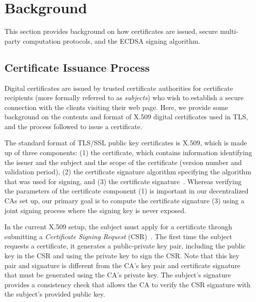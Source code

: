 \section{Background}
\label{sec:background}
This section provides background on how certificates are issued, secure multi-party computation protocols, and the ECDSA signing algorithm.

\subsection{Certificate Issuance Process}
\label{sec:certificate_issuance_process}

Digital certificates are issued by trusted certificate authorities for certificate recipients (more formally referred to as \emph{subjects}) who wish to establish a secure connection with the clients visiting their web page. Here, we provide some background on the contents and format of X.509 digital certificates used in TLS, and the process followed to issue a certificate.

 The standard format of TLS/SSL public key certificates is X.509, which is made up of three components: (1) the certificate, which contains information identifying the issuer and the subject and the scope of the certificate (version number and validation period), (2) the certificate signature algorithm specifying the algorithm that was used for signing, and (3) the certificate signature~\cite{x509_certificate_standard}. Whereas verifying the parameters of the certificate component (1) is important in our decentralized CAs set up, our primary goal is to compute the certificate signature (3) using a joint signing process where the signing key is never exposed.


In the current X.509 setup, the subject must apply for a certificate through submitting a \emph{Certificate Signing Request} (CSR)~\cite{certificate_signing_request}. The first time the subject requests a certificate, it generates a public-private key pair, including the public key in the CSR and using the private key to sign the CSR. Note that this key pair and signature is different from the CA's key pair and certificate signature that must be generated using the CA's private key. The subject's signature provides a consistency check that allows the CA to verify the CSR signature with the subject's provided public key. %

